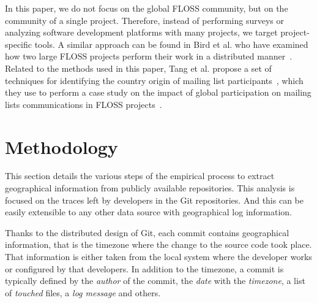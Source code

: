 \documentclass{sig-alternate-05-2015}
\begin{document}
In this paper, we do not focus on the global FLOSS community, but on the community
of a single project. Therefore, instead of performing surveys or analyzing
software development platforms with many projects, we target project-specific
tools. A similar approach can be found in Bird et al. who have examined how two 
large FLOSS projects perform their work in a distributed 
manner~\cite{bird2012examining}. Related to the methods used in this paper,
Tang et al. propose a set of 
techniques for identifying the country origin of mailing list 
participants~\cite{tang2009techniques}, which they use to perform a case study
on the impact of global participation on mailing lists communications in
FLOSS projects~\cite{tang2009case}.

\section{Methodology}
\label{sec:methodology}

This section details the various steps of the empirical process to extract 
geographical information from publicly available repositories. This analysis is 
focused on the traces left by developers in the Git repositories. And this can
be easily extensible to any other data source with geographical log information.


Thanks to the distributed design of Git, each commit contains geographical
information, that is the timezone where the change to the source code took place.
That information is either taken from the local system where the developer works or
configured by that developers.
In addition to the timezone, a commit is typically defined by the \emph{author} of the
commit, the \emph{date} with the \emph{timezone}, a list of \emph{touched} files,
a \emph{log message} and others. 


\end{document}
